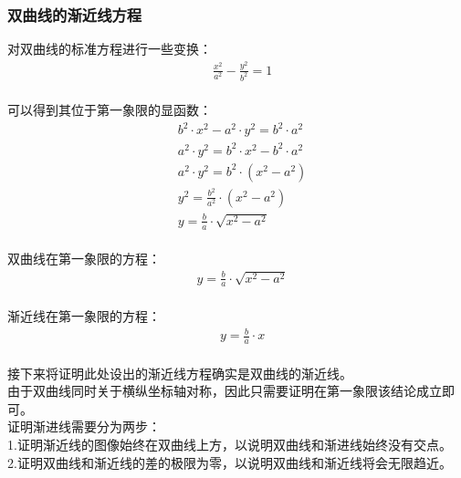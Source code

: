 \documentclass[UTF8]{ctexart}
\begin{document}
\newpage

\subsubsection{双曲线的渐近线方程}
    对双曲线的标准方程进行一些变换：
    \setcounter{equation}{0}
    \begin{align}
        &\frac{x^2}{a^2}-\frac{y^2}{b^2}=1
    \end{align}\\
    可以得到其位于第一象限的显函数：\vspace{3pt}
    \begin{align}
        &b^2\cdot x^2-a^2\cdot y^2=b^2\cdot a^2\\[5mm]
        &a^2\cdot y^2=b^2\cdot x^2-b^2\cdot a^2\\[5mm]
        &a^2\cdot y^2=b^2\cdot \left(x^2-a^2\right)\\[5mm]
        &y^2=\frac{b^2}{a^2}\cdot \left(x^2-a^2\right)\\[5mm]
        &y=\frac{b}{a}\cdot \sqrt{x^2-a^2}
    \end{align}\\
    双曲线在第一象限的方程：
    \begin{align}
        &y=\frac{b}{a}\cdot \sqrt{x^2-a^2}
    \end{align}\\
    渐近线在第一象限的方程：
    \begin{align}
        &y=\frac{b}{a}\cdot x  
    \end{align}\\
    接下来将证明此处设出的渐近线方程确实是双曲线的渐近线。\\[3mm]
    由于双曲线同时关于横纵坐标轴对称，因此只需要证明在第一象限该结论成立即可。\\[12mm]
    证明渐进线需要分为两步：\\[3mm]
    1.证明渐近线的图像始终在双曲线上方，以说明双曲线和渐进线始终没有交点。\\[3mm]
    2.证明双曲线和渐近线的差的极限为零，以说明双曲线和渐近线将会无限趋近。
    
\newpage
\end{document}
